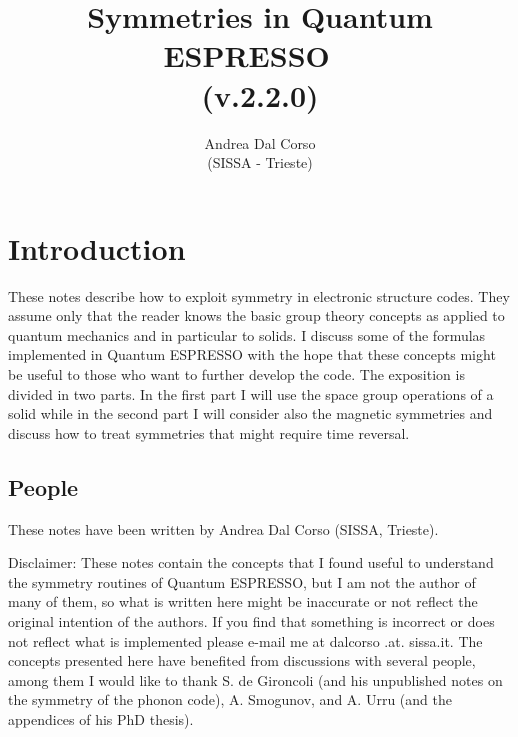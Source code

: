 \documentclass[12pt,a4paper,twoside]{report}
\def\version{2.2.0}
\begin{document}
\author{Andrea Dal Corso \\ (SISSA - Trieste)}
\date{}

\title{
  \vspace{3truecm}
  \Huge \color{dark-blue} Symmetries in Quantum ESPRESSO \ \\
   (v.\version)
}

\maketitle

\newpage

\tableofcontents

\newpage

\newpage
{\color{dark-blue}\chapter{Introduction}}
These notes describe how to exploit symmetry in electronic structure codes. They assume only that the reader knows the basic group theory concepts as applied to quantum mechanics and in particular to solids. I discuss some of the formulas implemented in Quantum ESPRESSO with the hope that these concepts might be useful to those who want to further develop the code. The exposition is divided in two parts. In the first part I will use the space group operations of a solid while in the second part I will consider also the magnetic symmetries and discuss how to treat symmetries that might require time reversal. 


\newpage
\section{People}
These notes have been written by Andrea Dal Corso (SISSA, Trieste). 

Disclaimer: These notes contain the concepts that I found useful to understand the symmetry routines of Quantum ESPRESSO, but I am not the author of many of them, so what is written here might be inaccurate or not reflect the original intention of the authors. If you find that something is incorrect or does not reflect what is implemented please e-mail me at dalcorso .at. sissa.it. 
The concepts presented here have benefited from discussions with several people, among them I would like to thank S. de Gironcoli (and his unpublished notes on the symmetry of the phonon code), A. Smogunov, and A. Urru (and the appendices of his PhD thesis). 
\end{document}
